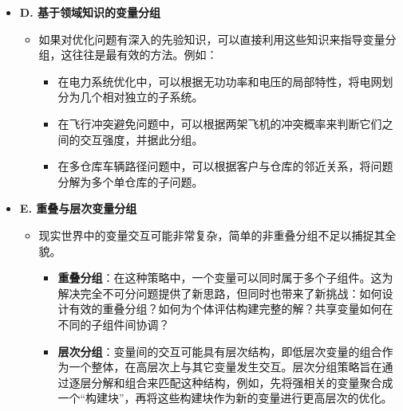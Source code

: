 \begin{itemize}
\begin{itemize}
\begin{itemize}
            \item \textbf{基于近似模型的方法}：对于评估代价昂贵的实际问题，可以用代理模型来近似目标函数。通过分析代理模型，如高维模型表示，可以揭示输入变量是如何独立或联合地影响输出的，从而识别变量交互。
            \item \textbf{链接自适应的方法}：这类方法在进化过程中动态地调整变量的分组方式。例如，可以在个体的染色体编码中附加一些标志位，这些标志位指示了基因之间的“链接”关系，并在进化的过程中通过遗传操作来学习和优化这些链接，从而将相互作用的基因自动组合在一起。
        \end{itemize}
        \item 基于交互学习的分组策略能够更精准地揭示问题的内在结构，从而大幅提升协同进化算法解决复杂不可分问题的能力。但其计算开销，特别是基于扰动和复杂模型的方法，是需要权衡的因素。
    \end{itemize}

    \item \textbf{D. 基于领域知识的变量分组}
    \begin{itemize}
        \item 如果对优化问题有深入的先验知识，可以直接利用这些知识来指导变量分组，这往往是最有效的方法。例如：
        \begin{itemize}
            \item 在电力系统优化中，可以根据无功功率和电压的局部特性，将电网划分为几个相对独立的子系统。
            \item 在飞行冲突避免问题中，可以根据两架飞机的冲突概率来判断它们之间的交互强度，并据此分组。
            \item 在多仓库车辆路径问题中，可以根据客户与仓库的邻近关系，将问题分解为多个单仓库的子问题。
        \end{itemize}
    \end{itemize}

    \item \textbf{E. 重叠与层次变量分组}
    \begin{itemize}
        \item 现实世界中的变量交互可能非常复杂，简单的非重叠分组不足以捕捉其全貌。
        \begin{itemize}
            \item \textbf{重叠分组}：在这种策略中，一个变量可以同时属于多个子组件。这为解决完全不可分问题提供了新思路，但同时也带来了新挑战：如何设计有效的重叠分组？如何为个体评估构建完整的解？共享变量如何在不同的子组件间协调？
            \item \textbf{层次分组}：变量间的交互可能具有层次结构，即低层次变量的组合作为一个整体，在高层次上与其它变量发生交互。层次分组策略旨在通过逐层分解和组合来匹配这种结构，例如，先将强相关的变量聚合成一个“构建块”，再将这些构建块作为新的变量进行更高层次的优化。
        \end{itemize}
    \end{itemize}


\end{itemize}
